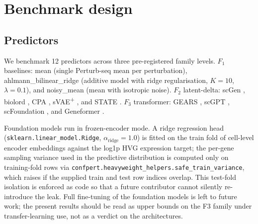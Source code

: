 \documentclass[11pt]{article}
\begin{document}
\section{Benchmark design}
\label{sec:design}

\subsection{Predictors}
\label{sec:predictors}
We benchmark 12 predictors across three pre-registered family levels.
$F_1$ baselines: mean (single Perturb-seq mean per perturbation),
ahlmann\_bilinear\_ridge \cite{ahlmann2025deep} (additive model with
ridge regularisation, $K = 10$, $\lambda = 0.1$), and noisy\_mean
(mean with isotropic noise). $F_2$ latent-delta: scGen
\cite{lotfollahi2019scgen}, biolord \cite{piran2024biolord}, CPA
\cite{lotfollahi2023cpa}, sVAE\textsuperscript{+}
\cite{bereket2023}, and STATE \cite{adduri2025state}. $F_3$
transformer: GEARS \cite{roohani2024gears}, scGPT
\cite{cui2024scgpt}, scFoundation \cite{hao2023scfoundation}, and
Geneformer \cite{theodoris2023geneformer}.

Foundation models run in frozen-encoder mode. A ridge regression head
(\texttt{sklearn.linear\_model.Ridge}, $\alpha_\text{ridge} = 1.0$) is
fitted on the train fold of cell-level encoder embeddings against the
log1p HVG expression target; the per-gene sampling variance used in the
predictive distribution is computed only on training-fold rows via
\texttt{confpert.heavyweight\_helpers.safe\_train\_variance}, which
raises if the supplied train and test row indices overlap. This
test-fold isolation is enforced as code so that a future contributor
cannot silently re-introduce the leak. Full fine-tuning of the
foundation models is left to future work; the present results should be
read as upper bounds on the F3 family under transfer-learning use, not
as a verdict on the architectures.
\end{document}
